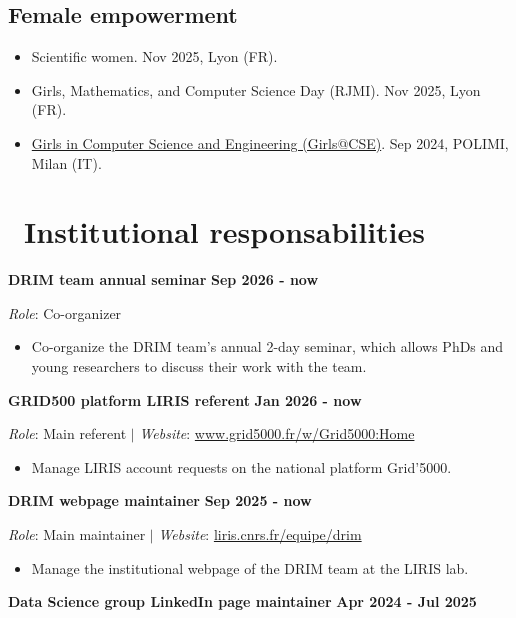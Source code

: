 \documentclass{article}
\begin{document}
\subsection*{Female empowerment}
\begin{itemize}
\item Scientific women. Nov 2025, Lyon (FR).
\item Girls, Mathematics, and Computer Science Day (RJMI). Nov 2025, Lyon (FR).
\item \href{https://www.deib.polimi.it/ita/eventi/dettagli/2987}{Girls in Computer Science and Engineering (Girls@CSE)}. Sep 2024, POLIMI, Milan (IT).
\end{itemize}
\section*{\faUniversity\ Institutional responsabilities}
\noindent\textbf{DRIM team annual seminar} \hfill \textbf{Sep 2026 - now}


\noindent\textit{Role}: Co-organizer

\begin{itemize}
\item Co-organize the DRIM team's annual 2-day seminar, which allows PhDs and young researchers to discuss their work with the team.
\end{itemize}
\vspace{1em}\noindent\textbf{GRID500 platform LIRIS referent} \hfill \textbf{Jan 2026 - now}


\noindent\textit{Role}: Main referent $|$ \textit{Website}: \href{https://www.grid5000.fr/w/Grid5000:Home}{www.grid5000.fr/w/Grid5000:Home}

\begin{itemize}
\item Manage LIRIS account requests on the national platform Grid'5000.
\end{itemize}
\vspace{1em}\noindent\textbf{DRIM webpage maintainer} \hfill \textbf{Sep 2025 - now}


\noindent\textit{Role}: Main maintainer $|$ \textit{Website}: \href{https://liris.cnrs.fr/equipe/drim}{liris.cnrs.fr/equipe/drim}

\begin{itemize}
\item Manage the institutional webpage of the DRIM team at the LIRIS lab.
\end{itemize}
\vspace{1em}\noindent\textbf{Data Science group LinkedIn page maintainer} \hfill \textbf{Apr 2024 - Jul 2025}
\end{document}
